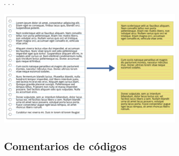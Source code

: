 . . .

\includegraphics[width=3.64583in,height=\textheight]{imagenes-cuali/Reduccion.png}

\hypertarget{comentarios-codigos}{%
\subsection{Comentarios de códigos}\label{comentarios-codigos}}

